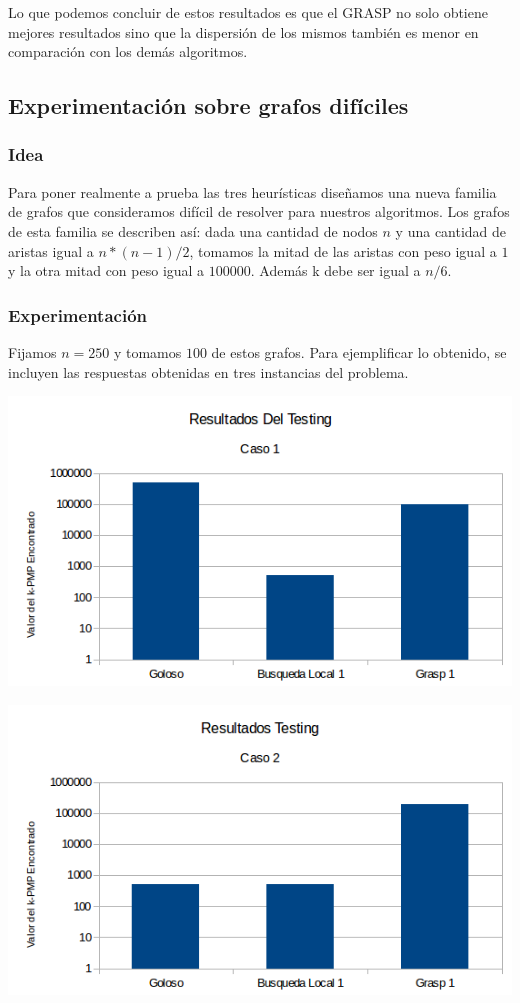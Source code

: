 Lo que podemos concluir de estos resultados es que el GRASP no solo obtiene mejores resultados sino que la dispersión de los mismos también es menor en comparación con los demás algoritmos. 

\subsection{Experimentación sobre grafos difíciles}

\subsubsection{Idea}

Para poner realmente a prueba las tres heurísticas diseñamos una nueva familia de grafos que consideramos difícil de resolver para nuestros algoritmos. Los grafos de esta familia se describen así: dada una cantidad de nodos $n$ y una cantidad de aristas igual a $n*(n-1)/2$, tomamos la mitad de las aristas con peso igual a $1$ y la otra mitad con peso igual a $100000$. Además k debe ser igual a $n/6$.

\subsubsection{Experimentación}

Fijamos $n=250$ y tomamos $100$ de estos grafos. Para ejemplificar lo obtenido, se incluyen las respuestas obtenidas en tres instancias del problema.

\includegraphics[scale=0.7]{Con/dificil1.png}

\includegraphics[scale=0.7]{Con/dificil2.png}

